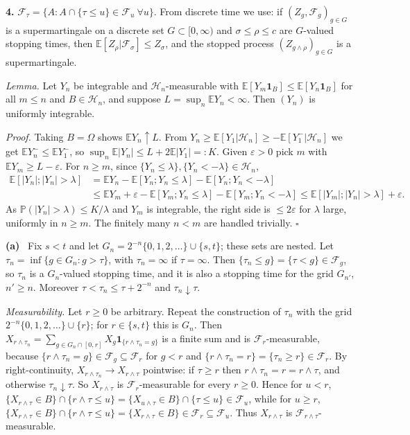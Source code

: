 \documentclass[11pt,a4paper]{article}
\newcommand{\E}{\mathbb{E}}
\renewcommand{\P}{\mathbb{P}}
\newcommand{\F}{\mathcal{F}}
\newcommand{\Hc}{\mathcal{H}}
\newcommand{\1}{\mathbf{1}}
\newcommand{\prob}[1]{\par\medskip\noindent\textbf{#1}\quad}
\newcommand{\sub}[1]{\par\smallskip\noindent\textbf{#1}\ }
\begin{document}
\prob{4.}
$\F_\tau=\{A:A\cap\{\tau\le u\}\in\F_u\ \forall u\}$. From discrete time we use: if $(Z_g,\F_g)_{g\in G}$ is a
supermartingale on a discrete set $G\subset[0,\infty)$ and $\sigma\le\rho\le c$ are $G$-valued stopping
times, then $\E[Z_\rho|\F_\sigma]\le Z_\sigma$, and the stopped process $(Z_{g\wedge\rho})_{g\in G}$ is a
supermartingale.

\emph{Lemma.} Let $Y_n$ be integrable and $\Hc_n$-measurable with $\E[Y_m\1_B]\le\E[Y_n\1_B]$ for all $m\le n$ and
$B\in\Hc_n$, and suppose $L=\sup_n\E Y_n<\infty$. Then $(Y_n)$ is uniformly integrable.

\emph{Proof.} Taking $B=\Omega$ shows $\E Y_n\uparrow L$. From $Y_n\ge\E[Y_1|\Hc_n]\ge-\E[Y_1^-|\Hc_n]$ we get $\E Y_n^-\le\E Y_1^-$, so
$\sup_n\E|Y_n|\le L+2\E|Y_1|=:K$. Given $\varepsilon>0$ pick $m$ with $\E Y_m\ge L-\varepsilon$. For $n\ge m$, since
$\{Y_n\le\lambda\},\{Y_n<-\lambda\}\in\Hc_n$,
\begin{align*}
\E[|Y_n|;|Y_n|>\lambda]&=\E Y_n-\E[Y_n;Y_n\le\lambda]-\E[Y_n;Y_n<-\lambda]\\
&\le\E Y_m+\varepsilon-\E[Y_m;Y_n\le\lambda]-\E[Y_m;Y_n<-\lambda]\le\E[|Y_m|;|Y_n|>\lambda]+\varepsilon .
\end{align*}
As $\P(|Y_n|>\lambda)\le K/\lambda$ and $Y_m$ is integrable, the right side is $\le2\varepsilon$ for $\lambda$ large, uniformly in $n\ge m$.
The finitely many $n<m$ are handled trivially. \hfill$\square$

\sub{(a)} Fix $s<t$ and let $G_n=2^{-n}\{0,1,2,\dots\}\cup\{s,t\}$; these sets are nested. Let $\tau_n=\inf\{g\in G_n:g>\tau\}$, with $\tau_n=\infty$ if
$\tau=\infty$. Then $\{\tau_n\le g\}=\{\tau<g\}\in\F_g$, so $\tau_n$ is a $G_n$-valued stopping time, and
it is also a stopping time for the grid $G_{n'}$, $n'\ge n$. Moreover $\tau<\tau_n\le\tau+2^{-n}$ and $\tau_n\downarrow\tau$.

\emph{Measurability.} Let $r\ge0$ be arbitrary. Repeat the construction of $\tau_n$ with the grid
$2^{-n}\{0,1,2,\dots\}\cup\{r\}$; for $r\in\{s,t\}$ this is $G_n$. Then
$X_{r\wedge\tau_n}=\sum_{g\in G_n\cap[0,r]}X_g\1_{\{r\wedge\tau_n=g\}}$ is a finite sum and is $\F_r$-measurable, because
$\{r\wedge\tau_n=g\}\in\F_g\subseteq\F_r$ for $g<r$ and $\{r\wedge\tau_n=r\}=\{\tau_n\ge r\}\in\F_r$. By
right-continuity, $X_{r\wedge\tau_n}\to X_{r\wedge\tau}$ pointwise: if $\tau\ge r$ then $r\wedge\tau_n=r=r\wedge\tau$,
and otherwise $\tau_n\downarrow\tau$. So $X_{r\wedge\tau}$ is $\F_r$-measurable for every $r\ge0$. Hence for $u<r$,
$\{X_{r\wedge\tau}\in B\}\cap\{r\wedge\tau\le u\}=\{X_{u\wedge\tau}\in B\}\cap\{\tau\le u\}\in\F_u$, while for $u\ge r$,
$\{X_{r\wedge\tau}\in B\}\cap\{r\wedge\tau\le u\}=\{X_{r\wedge\tau}\in B\}\in\F_r\subseteq\F_u$. Thus $X_{r\wedge\tau}$ is
$\F_{r\wedge\tau}$-measurable.
\end{document}
